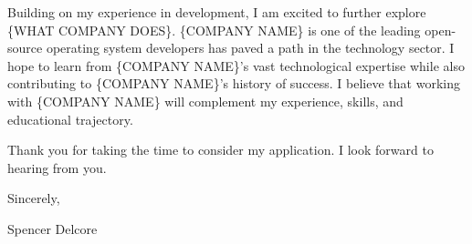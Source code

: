 \documentclass{resume}
\begin{document}
\hspace{36pt}
Building on my experience in development, I am excited to further explore \{WHAT COMPANY DOES\}. \{COMPANY NAME\} is one of the leading open-source operating system developers has paved a path in the technology sector. I hope to learn from \{COMPANY NAME\}'s vast technological expertise while also contributing to \{COMPANY NAME\}'s history of success. I believe that working with \{COMPANY NAME\} will complement my experience, skills, and educational trajectory.

\hspace{36pt}
Thank you for taking the time to consider my application. I look forward to hearing from you.

Sincerely,

Spencer Delcore
\end{document}
